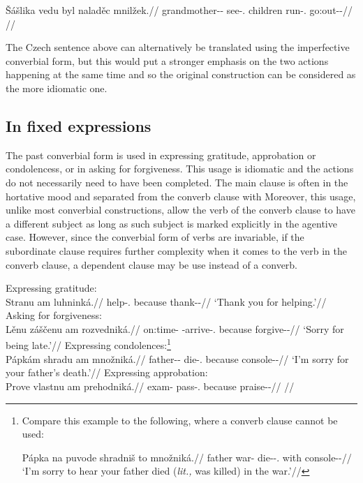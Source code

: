 \pex
\begingl
\gla Šášlika vedu byl naladěc mnilžek.//
\glb grandmother-\Dim{}-\Acc{} see-\Cv{}.\Pf{} children run-\Cv{}.\Ipf{} go:out-\Av{}-\Pf{}//
\glft {}//
\endgl
\xe

The Czech sentence above can alternatively be translated using the
imperfective converbial form, but this would put a stronger emphasis on the two
actions happening at the same time and so the original construction can be
considered as the more idiomatic one.

\subsection{In fixed expressions}

The past converbial form is used in expressing gratitude, approbation or
condolencess, or in asking for forgiveness. This usage is idiomatic and the
actions do not necessarily need to have been completed. The main clause is often
in the hortative mood and separated from the converb
clause with  Moreover, this usage, unlike most converbial
constructions, allow the verb of the converb clause to have a different subject
as long as such subject is marked explicitly in the agentive case. However,
since the converbial form of verbs are invariable, if the subordinate clause
requires further complexity when it comes to the verb in the converb clause, a
dependent  clause may be use instead of a converb.

\pex
\a Expressing gratitude:\\
\begingl
\gla Stranu am luhninká.//
\glb help-\Cv{}.\Pf{} because thank-\Pv{}-\Hort{}//
\glft `Thank you for helping.'//
\endgl
\a Asking for forgiveness:\\
\begingl
\gla Lěnu záščenu am rozvedniká.//
\glb on:time-\Ins{} \Neg{}-arrive-\Cv{}.\Pf{} because forgive-\Pv{}-\Hort{}//
\glft `Sorry for being late.'//
\endgl
\a Expressing condolences:\footnote{Compare this example to the following, where
a converb clause cannot be used:

\ex[lingstyle=fnex,belowexskip=-1em]
\begingl
\gla Pápka na puvode shradniš to množniká.//
\glb father \Loc{} war-\Acc{} die-\Pv{}-\Subj.\Pf{} \Rz{} with console-\Pv{}-\Hort{}//
\glft `I'm sorry to hear your father died (\emph{lit.,} was killed) in the war.'//
\endgl\xe}\\
\begingl
\gla Pápkám shradu am množniká.//
\glb father-\Dim{}-\Agt{} die-\Cv{}.\Pf{} because console-\Pv{}-\Hort{}//
\glft `I'm sorry for your father's death.'//
\endgl
\a Expressing approbation:\\
\begingl
\gla Prove vlastnu am prehodniká.//
\glb exam-\Acc{} pass-\Cv{}.\Pf{} because praise-\Pv{}-\Hort{}//
\glft {}//
\endgl
\xe

